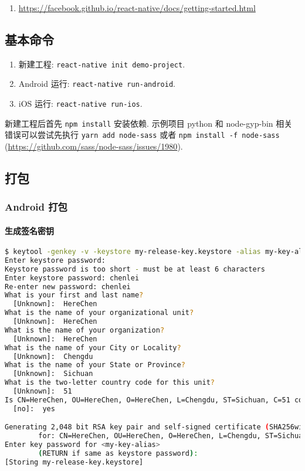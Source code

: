 \begin{enumerate}
\def\labelenumi{\arabic{enumi}.}
\tightlist
\item
  \url{https://facebook.github.io/react-native/docs/getting-started.html}
\end{enumerate}

\subsection{基本命令}\label{ux57faux672cux547dux4ee4}

\begin{enumerate}
\def\labelenumi{\arabic{enumi}.}
\tightlist
\item
  新建工程: \lstinline!react-native init demo-project!.
\item
  Android 运行: \lstinline!react-native run-android!.
\item
  iOS 运行: \lstinline!react-native run-ios!.
\end{enumerate}

新建工程后首先 \lstinline!npm install! 安装依赖. 示例项目 python 和
node-gyp-bin 相关错误可以尝试先执行 \lstinline!yarn add node-sass! 或者
\lstinline!npm install -f node-sass!
(\url{https://github.com/sass/node-sass/issues/1980}).

\subsection{打包}\label{ux6253ux5305}

\subsubsection{Android 打包}\label{android-ux6253ux5305}

\paragraph{生成签名密钥}\label{ux751fux6210ux7b7eux540dux5bc6ux94a5}

\begin{lstlisting}[language=bash]
$ keytool -genkey -v -keystore my-release-key.keystore -alias my-key-alias -keyalg RSA -keysize 2048 -validity 10000
Enter keystore password:
Keystore password is too short - must be at least 6 characters
Enter keystore password: chenlei
Re-enter new password: chenlei
What is your first and last name?
  [Unknown]:  HereChen
What is the name of your organizational unit?
  [Unknown]:  HereChen
What is the name of your organization?
  [Unknown]:  HereChen
What is the name of your City or Locality?
  [Unknown]:  Chengdu
What is the name of your State or Province?
  [Unknown]:  Sichuan
What is the two-letter country code for this unit?
  [Unknown]:  51
Is CN=HereChen, OU=HereChen, O=HereChen, L=Chengdu, ST=Sichuan, C=51 correct?
  [no]:  yes

Generating 2,048 bit RSA key pair and self-signed certificate (SHA256withRSA) with a validity of 10,000 days
        for: CN=HereChen, OU=HereChen, O=HereChen, L=Chengdu, ST=Sichuan, C=51
Enter key password for <my-key-alias>
        (RETURN if same as keystore password):
[Storing my-release-key.keystore]
\end{lstlisting}

